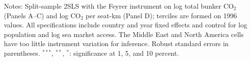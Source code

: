 \documentclass[12pt]{article}
\begin{document}
\begin{table}[htbp]
\begin{threeparttable}
\begin{tabular}{lcccc}
\bottomrule
\end{tabular}
\begin{tablenotes}[flushleft]
\footnotesize
\item Notes: Split-sample 2SLS with the Feyrer instrument on log total bunker CO$_2$ (Panels A--C) and log CO$_2$ per seat-km (Panel D); terciles are formed on 1996 values. All specifications include country and year fixed effects and control for log population and log sea market access. The Middle East and North America cells have too little instrument variation for inference. Robust standard errors in parentheses. $^{***}$, $^{**}$, $^{*}$: significance at 1, 5, and 10 percent.
\end{tablenotes}
\end{threeparttable}
\end{table}
\end{document}
